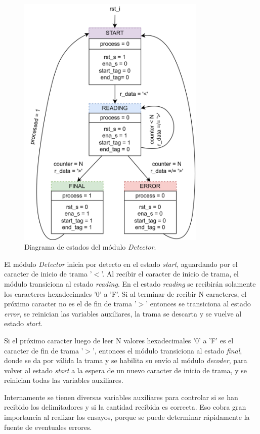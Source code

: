 	\begin{figure}[H]
		\centering
		\includegraphics[width=0.8\textwidth]{Figuras/Detector_FSMD.png}
		\centering\caption{Diagrama de estados del módulo \textit{Detector}.}
		\label{fig:Detector_FSMD}
	\end{figure}
	
	El módulo \textit{Detector} inicia por detecto en el estado \textit{start}, aguardando por el caracter de inicio de trama '$<$'. Al recibir el caracter de inicio de trama, el módulo transiciona al estado \textit{reading}. En el estado \textit{reading} se recibirán solamente los caracteres hexadecimales '0' a 'F'. Si al terminar de recibir N caracteres, el próximo caracter no es el de fin de trama '$>$' entonces se transiciona al estado \textit{error}, se reinician las variables auxiliares, la trama se descarta y se vuelve al estado \textit{start}.
	
	Si el próximo caracter luego de leer N valores hexadecimales '0' a 'F' es el caracter de fin de trama '$>$', entonces el módulo transiciona al estado \textit{final}, donde se da por válida la trama y se habilita su envío al módulo \textit{decoder}, para volver al estado \textit{start} a la espera de un nuevo caracter de inicio de trama, y se reinician todas las variables auxiliares.
	
	Internamente se tienen diversas variables auxiliares para controlar si se han recibido los delimitadores y si la cantidad recibida es correcta. Eso cobra gran importancia al realizar los ensayos, porque se puede determinar rápidamente la fuente de eventuales errores.